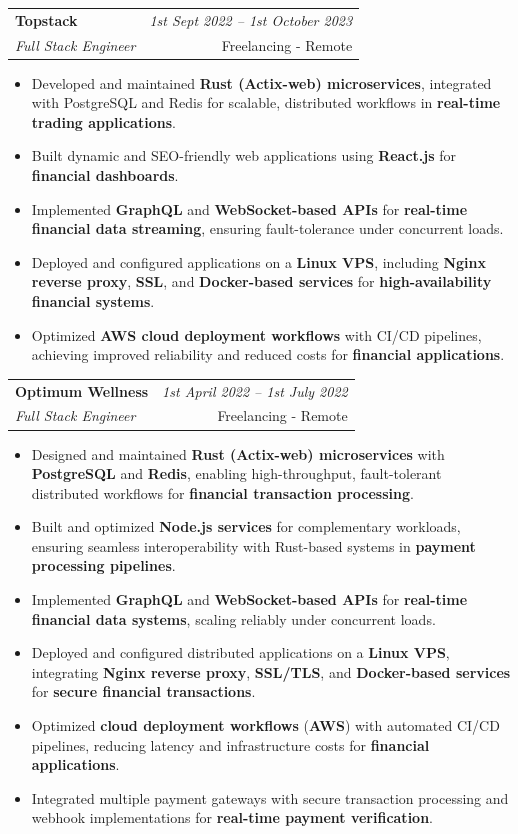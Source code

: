 \documentclass[a4paper,11pt]{article}
\makeatletter
\newcommand{\resumeSubheading}[4]{
\vspace{0.5mm}
    \item[] 
    \begin{tabular*}{0.98\textwidth}[t]{l@{\extracolsep{\fill}}r}
        \textbf{#1} & \textit{\footnotesize{#4}} \\
        \it{\footnotesize{#3}} & \footnotesize{#2} \\
    \end{tabular*}
    \vspace{-2.4mm}
}
\newcommand{\resumeItemListStart}{\begin{justify}\begin{itemize}[leftmargin=3ex, rightmargin=2ex, noitemsep,labelsep=1.2mm,itemsep=0mm]\small}
\newcommand{\resumeItemListEnd}{\end{itemize}\end{justify}\vspace{-2mm}}
\makeatother
\begin{document}
    \vspace{-3.0mm}

    \resumeSubheading
      {Topstack}{Freelancing - Remote}
      {Full Stack Engineer}{1st Sept 2022 -- 1st October 2023}
      \vspace{-2.0mm}
      \resumeItemListStart
          \item Developed and maintained \textbf{Rust (Actix-web) microservices}, integrated with PostgreSQL and Redis for scalable, distributed workflows in \textbf{real-time trading applications}.
          \item {Built dynamic and SEO-friendly web applications using \textbf{React.js} for \textbf{financial dashboards}.}
          \item Implemented \textbf{GraphQL} and \textbf{WebSocket-based APIs} for \textbf{real-time financial data streaming}, ensuring fault-tolerance under concurrent loads.
          \item Deployed and configured applications on a \textbf{Linux VPS}, including \textbf{Nginx reverse proxy}, \textbf{SSL}, and \textbf{Docker-based services} for \textbf{high-availability financial systems}.
          \item Optimized \textbf{AWS cloud deployment workflows} with CI/CD pipelines, achieving improved reliability and reduced costs for \textbf{financial applications}.
 
    \resumeItemListEnd
    
    \vspace{-3.0mm}

    \resumeSubheading
      {Optimum Wellness}{Freelancing - Remote}
      {Full Stack Engineer}{1st April 2022 -- 1st July 2022}
      \vspace{-2.0mm}
      \resumeItemListStart
          \item Designed and maintained \textbf{Rust (Actix-web) microservices} with \textbf{PostgreSQL} and \textbf{Redis}, enabling high-throughput, fault-tolerant distributed workflows for \textbf{financial transaction processing}.
          \item Built and optimized \textbf{Node.js services} for complementary workloads, ensuring seamless interoperability with Rust-based systems in \textbf{payment processing pipelines}.
          \item Implemented \textbf{GraphQL} and \textbf{WebSocket-based APIs} for \textbf{real-time financial data systems}, scaling reliably under concurrent loads.
          \item Deployed and configured distributed applications on a \textbf{Linux VPS}, integrating \textbf{Nginx reverse proxy}, \textbf{SSL/TLS}, and \textbf{Docker-based services} for \textbf{secure financial transactions}.
          \item Optimized \textbf{cloud deployment workflows} (\textbf{AWS}) with automated CI/CD pipelines, reducing latency and infrastructure costs for \textbf{financial applications}.
          \item {Integrated multiple payment gateways with secure transaction processing and webhook implementations for \textbf{real-time payment verification}.} 
    \resumeItemListEnd
    
\end{document}
